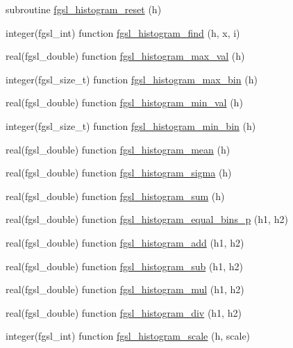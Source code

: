 \begin{DoxyCompactItemize}
\item 
subroutine \hyperlink{histogram_8finc_a49fea1a4cd3aea567784135c870153c1}{fgsl\+\_\+histogram\+\_\+reset} (h)
\item 
integer(fgsl\+\_\+int) function \hyperlink{histogram_8finc_a8c4b14ac540a9a068900fd3e35ee7159}{fgsl\+\_\+histogram\+\_\+find} (h, x, i)
\item 
real(fgsl\+\_\+double) function \hyperlink{histogram_8finc_aa210e74511fada1333cf9a7a4d8b2557}{fgsl\+\_\+histogram\+\_\+max\+\_\+val} (h)
\item 
integer(fgsl\+\_\+size\+\_\+t) function \hyperlink{histogram_8finc_ac32e63df5114b7157f1616e659988426}{fgsl\+\_\+histogram\+\_\+max\+\_\+bin} (h)
\item 
real(fgsl\+\_\+double) function \hyperlink{histogram_8finc_ab0fb2cc0ccc968ef2810a13320e08a0b}{fgsl\+\_\+histogram\+\_\+min\+\_\+val} (h)
\item 
integer(fgsl\+\_\+size\+\_\+t) function \hyperlink{histogram_8finc_a36924510341b52382469d95253f64918}{fgsl\+\_\+histogram\+\_\+min\+\_\+bin} (h)
\item 
real(fgsl\+\_\+double) function \hyperlink{histogram_8finc_a03754e56f78dcc887273fab1e8ac0b98}{fgsl\+\_\+histogram\+\_\+mean} (h)
\item 
real(fgsl\+\_\+double) function \hyperlink{histogram_8finc_a507669e9246974308454e7fa641a9211}{fgsl\+\_\+histogram\+\_\+sigma} (h)
\item 
real(fgsl\+\_\+double) function \hyperlink{histogram_8finc_a11059753ca12bf2c8f77900c47f3eb75}{fgsl\+\_\+histogram\+\_\+sum} (h)
\item 
real(fgsl\+\_\+double) function \hyperlink{histogram_8finc_a593970dbd233b22cc063121a4664ea41}{fgsl\+\_\+histogram\+\_\+equal\+\_\+bins\+\_\+p} (h1, h2)
\item 
real(fgsl\+\_\+double) function \hyperlink{histogram_8finc_ab700a51e118baabdd3fe4589a0083157}{fgsl\+\_\+histogram\+\_\+add} (h1, h2)
\item 
real(fgsl\+\_\+double) function \hyperlink{histogram_8finc_abac617a60f5a51da9555b6f2a8cedc87}{fgsl\+\_\+histogram\+\_\+sub} (h1, h2)
\item 
real(fgsl\+\_\+double) function \hyperlink{histogram_8finc_a1712b526a7c62831c9891515dd2193cd}{fgsl\+\_\+histogram\+\_\+mul} (h1, h2)
\item 
real(fgsl\+\_\+double) function \hyperlink{histogram_8finc_a28f472750d348b24111cf4090e079838}{fgsl\+\_\+histogram\+\_\+div} (h1, h2)
\item 
integer(fgsl\+\_\+int) function \hyperlink{histogram_8finc_a0d549e18c22aae049e46dae9417c90f0}{fgsl\+\_\+histogram\+\_\+scale} (h, scale)

\end{DoxyCompactItemize}
